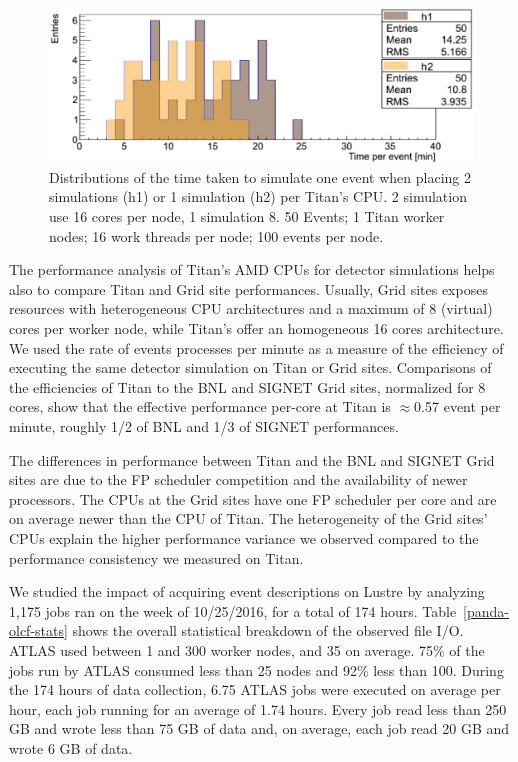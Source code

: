 \begin{figure}[htp]
    \includegraphics[clip,width=\columnwidth]{figures/tx8_tx16_comparison_vsquashed.pdf}
   \vspace{-0.3in}
    \caption{Distributions of the time taken to simulate one event when
    placing 2 simulations (h1) or 1 simulation (h2) per Titan's CPU. 2
    simulation use 16 cores per node, 1 simulation 8. 50 Events; 1 Titan
    worker nodes; 16 work threads per node; 100 events per node.}

\label{fig:comparison-8-16cores}
\end{figure}

The performance analysis of Titan's AMD CPUs for detector simulations helps
also to compare Titan and Grid site performances. Usually, Grid sites exposes
resources with heterogeneous CPU architectures and a maximum of 8 (virtual)
cores per worker node, while Titan's offer an homogeneous 16 cores
architecture. We used the rate of events processes per minute as a measure of
the efficiency of executing the same detector simulation on Titan or Grid
sites. Comparisons of the efficiencies of Titan to the BNL and SIGNET Grid
sites, normalized for 8 cores, show that the effective performance per-core
at Titan is $\approx$0.57 event per minute, roughly 1/2 of BNL and  1/3 of
SIGNET performances.

The differences in performance between Titan and the BNL and SIGNET Grid
sites are due to the FP scheduler competition and the availability of newer
processors. The CPUs at the Grid sites have one FP scheduler per core and are
on average newer than the CPU of Titan. The heterogeneity of the Grid sites'
CPUs explain the higher performance variance we observed compared to the
performance consistency we measured on Titan.

We studied the impact of acquiring event descriptions on Lustre by analyzing
1,175 jobs ran on the week of 10/25/2016, for a total of 174 hours.
Table~\ref{panda-olcf-stats} shows the overall statistical breakdown of the
observed file I/O. ATLAS used between 1 and 300 worker nodes, and 35 on
average. 75\% of the jobs run by ATLAS consumed less than 25 nodes and 92\%
less than 100. During the 174 hours of data collection, 6.75 ATLAS jobs were
executed on average per hour, each job running for an average of 1.74 hours.
Every job read less than 250 GB and wrote less than 75 GB of data and, on
average, each job read 20 GB and wrote 6 GB of data.

